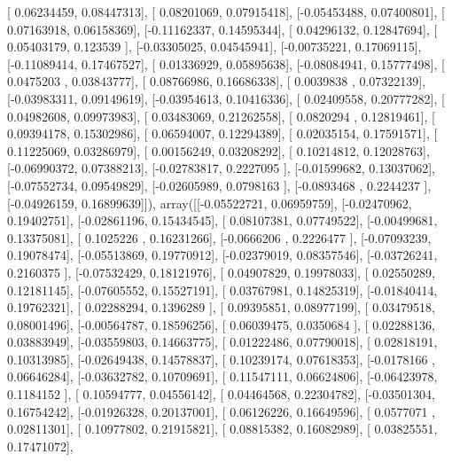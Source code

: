 \documentclass{article}
\begin{document}
       [ 0.06234459,  0.08447313],
       [ 0.08201069,  0.07915418],
       [-0.05453488,  0.07400801],
       [ 0.07163918,  0.06158369],
       [-0.11162337,  0.14595344],
       [ 0.04296132,  0.12847694],
       [ 0.05403179,  0.123539  ],
       [-0.03305025,  0.04545941],
       [-0.00735221,  0.17069115],
       [-0.11089414,  0.17467527],
       [ 0.01336929,  0.05895638],
       [-0.08084941,  0.15777498],
       [ 0.0475203 ,  0.03843777],
       [ 0.08766986,  0.16686338],
       [ 0.0039838 ,  0.07322139],
       [-0.03983311,  0.09149619],
       [-0.03954613,  0.10416336],
       [ 0.02409558,  0.20777282],
       [ 0.04982608,  0.09973983],
       [ 0.03483069,  0.21262558],
       [ 0.0820294 ,  0.12819461],
       [ 0.09394178,  0.15302986],
       [ 0.06594007,  0.12294389],
       [ 0.02035154,  0.17591571],
       [ 0.11225069,  0.03286979],
       [ 0.00156249,  0.03208292],
       [ 0.10214812,  0.12028763],
       [-0.06990372,  0.07388213],
       [-0.02783817,  0.2227095 ],
       [-0.01599682,  0.13037062],
       [-0.07552734,  0.09549829],
       [-0.02605989,  0.0798163 ],
       [-0.0893468 ,  0.2244237 ],
       [-0.04926159,  0.16899639]]), array([[-0.05522721,  0.06959759],
       [-0.02470962,  0.19402751],
       [-0.02861196,  0.15434545],
       [ 0.08107381,  0.07749522],
       [-0.00499681,  0.13375081],
       [ 0.1025226 ,  0.16231266],
       [-0.0666206 ,  0.2226477 ],
       [-0.07093239,  0.19078474],
       [-0.05513869,  0.19770912],
       [-0.02379019,  0.08357546],
       [-0.03726241,  0.2160375 ],
       [-0.07532429,  0.18121976],
       [ 0.04907829,  0.19978033],
       [ 0.02550289,  0.12181145],
       [-0.07605552,  0.15527191],
       [ 0.03767981,  0.14825319],
       [-0.01840414,  0.19762321],
       [ 0.02288294,  0.1396289 ],
       [ 0.09395851,  0.08977199],
       [ 0.03479518,  0.08001496],
       [-0.00564787,  0.18596256],
       [ 0.06039475,  0.0350684 ],
       [ 0.02288136,  0.03883949],
       [-0.03559803,  0.14663775],
       [ 0.01222486,  0.07790018],
       [ 0.02818191,  0.10313985],
       [-0.02649438,  0.14578837],
       [ 0.10239174,  0.07618353],
       [-0.0178166 ,  0.06646284],
       [-0.03632782,  0.10709691],
       [ 0.11547111,  0.06624806],
       [-0.06423978,  0.1184152 ],
       [ 0.10594777,  0.04556142],
       [ 0.04464568,  0.22304782],
       [-0.03501304,  0.16754242],
       [-0.01926328,  0.20137001],
       [ 0.06126226,  0.16649596],
       [ 0.0577071 ,  0.02811301],
       [ 0.10977802,  0.21915821],
       [ 0.08815382,  0.16082989],
       [ 0.03825551,  0.17471072],
\end{document}
